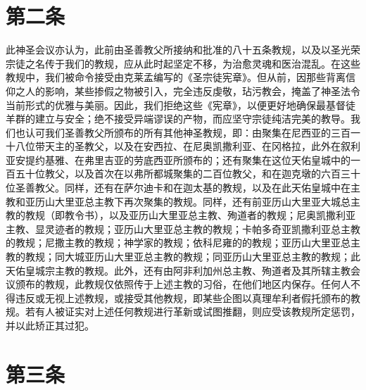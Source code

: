 \section{第二条}

此神圣会议亦认为，此前由圣善教父所接纳和批准的八十五条教规，以及以圣光荣宗徒之名传于我们的教规，应从此时起坚定不移，为治愈灵魂和医治混乱。在这些教规中，我们被命令接受由克莱孟编写的《圣宗徒宪章》。但从前，因那些背离信仰之人的影响，某些掺假之物被引入，完全违反虔敬，玷污教会，掩盖了神圣法令当前形式的优雅与美丽。因此，我们拒绝这些《宪章》，以便更好地确保最基督徒羊群的建立与安全；绝不接受异端谬误的产物，而应坚守宗徒纯洁完美的教导。我们也认可我们圣善教父所颁布的所有其他神圣教规，即：由聚集在尼西亚的三百一十八位带天主的圣教父，以及在安西拉、在尼奥凯撒利亚、在冈格拉，此外在叙利亚安提约基雅、在弗里吉亚的劳底西亚所颁布的；还有聚集在这位天佑皇城中的一百五十位教父，以及首次在以弗所都城聚集的二百位教父，和在迦克墩的六百三十位圣善教父。同样，还有在萨尔迪卡和在迦太基的教规，以及在此天佑皇城中在主教和亚历山大里亚总主教下再次聚集的教规。同样，还有前亚历山大里亚大城总主教的教规（即教令书），以及亚历山大里亚总主教、殉道者的教规；尼奥凯撒利亚主教、显灵迹者的教规；亚历山大里亚总主教的教规；卡帕多奇亚凯撒利亚总主教的教规；尼撒主教的教规；神学家的教规；依科尼雍的的教规；亚历山大里亚总主教的教规；同大城亚历山大里亚总主教的教规；同亚历山大里亚总主教的教规；此天佑皇城宗主教的教规。此外，还有由阿非利加州总主教、殉道者及其所辖主教会议颁布的教规，此教规仅依照传于上述主教的习俗，在他们地区内保存。任何人不得违反或无视上述教规，或接受其他教规，即某些企图以真理牟利者假托颁布的教规。若有人被证实对上述任何教规进行革新或试图推翻，则应受该教规所定惩罚，并以此矫正其过犯。\par


\section{第三条}

